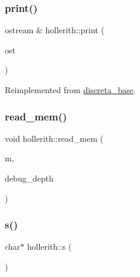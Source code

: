 \mbox{\label{classhollerith_a35f4d87aef8f1dd7f09f57ace1c5ea4a}} 
\subsubsection{\texorpdfstring{print()}{print()}}
{\footnotesize\ttfamily ostream \& hollerith\+::print (\begin{DoxyParamCaption}\item[{ostream \&}]{ost }\end{DoxyParamCaption})\hspace{0.3cm}{\ttfamily [virtual]}}



Reimplemented from \mbox{\hyperlink{classdiscreta__base_a036e48bc058347046fc9b73dd0951478}{discreta\+\_\+base}}.

\mbox{\label{classhollerith_af6cbbe5728658ff3a71fc9fe331bb39f}} 
\subsubsection{\texorpdfstring{read\+\_\+mem()}{read\_mem()}}
{\footnotesize\ttfamily void hollerith\+::read\+\_\+mem (\begin{DoxyParamCaption}\item[{\mbox{\hyperlink{classmemory}{memory}} \&}]{m,  }\item[{\mbox{\hyperlink{galois_8h_a09fddde158a3a20bd2dcadb609de11dc}{I\+NT}}}]{debug\+\_\+depth }\end{DoxyParamCaption})}

\mbox{\label{classhollerith_af61fce2d06f211b25fe3838e4dfee77a}} 
\subsubsection{\texorpdfstring{s()}{s()}}
{\footnotesize\ttfamily char$\ast$ hollerith\+::s (\begin{DoxyParamCaption}{ }\end{DoxyParamCaption})\hspace{0.3cm}{\ttfamily [inline]}}

